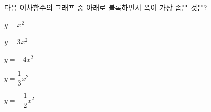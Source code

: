 다음 이차함수의 그래프 중 아래로 볼록하면서 폭이 가장 좁은 것은?
\begin{choices32}{\rule[-3ex]{0pt}{8ex}$y=x^2$}{\rule[-3ex]{0pt}{8ex}$y=3x^2$}{\rule[-3ex]{0pt}{8ex}$y=-4x^2$}{\rule[-3ex]{0pt}{8ex}$y=\dfrac{1}{3}x^2$}{\rule[-3ex]{0pt}{8ex}$y=-\dfrac{1}{2}x^2$}\end{choices32}

